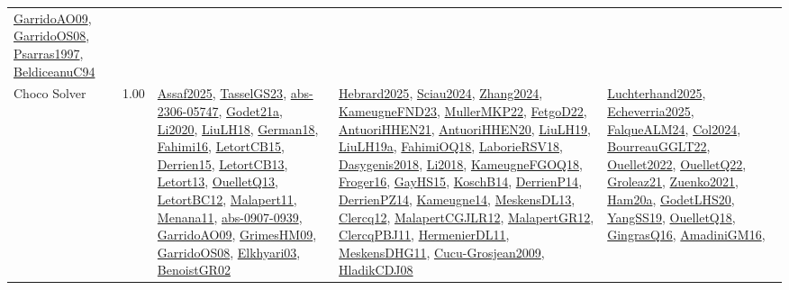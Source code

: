 {\begin{longtable}{p{3cm}r>{\raggedright\arraybackslash}p{6cm}>{\raggedright\arraybackslash}p{6cm}>{\raggedright\arraybackslash}p{8cm}}
\hyperref[detail:GarridoAO09]{GarridoAO09}, \hyperref[detail:GarridoOS08]{GarridoOS08}, \hyperref[detail:Psarras1997]{Psarras1997}, \hyperref[detail:BeldiceanuC94]{BeldiceanuC94}\\
\index{Choco Solver}\index{CPSystems!Choco Solver}Choco Solver &  1.00 & \hyperref[detail:Assaf2025]{Assaf2025}, \hyperref[detail:TasselGS23]{TasselGS23}, \hyperref[detail:abs-2306-05747]{abs-2306-05747}, \hyperref[detail:Godet21a]{Godet21a}, \hyperref[detail:Li2020]{Li2020}, \hyperref[detail:LiuLH18]{LiuLH18}, \hyperref[detail:German18]{German18}, \hyperref[detail:Fahimi16]{Fahimi16}, \hyperref[detail:LetortCB15]{LetortCB15}, \hyperref[detail:Derrien15]{Derrien15}, \hyperref[detail:LetortCB13]{LetortCB13}, \hyperref[detail:Letort13]{Letort13}, \hyperref[detail:OuelletQ13]{OuelletQ13}, \hyperref[detail:LetortBC12]{LetortBC12}, \hyperref[detail:Malapert11]{Malapert11}, \hyperref[detail:Menana11]{Menana11}, \hyperref[detail:abs-0907-0939]{abs-0907-0939}, \hyperref[detail:GarridoAO09]{GarridoAO09}, \hyperref[detail:GrimesHM09]{GrimesHM09}, \hyperref[detail:GarridoOS08]{GarridoOS08}, \hyperref[detail:Elkhyari03]{Elkhyari03}, \hyperref[detail:BenoistGR02]{BenoistGR02} & \hyperref[detail:Hebrard2025]{Hebrard2025}, \hyperref[detail:Sciau2024]{Sciau2024}, \hyperref[detail:Zhang2024]{Zhang2024}, \hyperref[detail:KameugneFND23]{KameugneFND23}, \hyperref[detail:MullerMKP22]{MullerMKP22}, \hyperref[detail:FetgoD22]{FetgoD22}, \hyperref[detail:AntuoriHHEN21]{AntuoriHHEN21}, \hyperref[detail:AntuoriHHEN20]{AntuoriHHEN20}, \hyperref[detail:LiuLH19]{LiuLH19}, \hyperref[detail:LiuLH19a]{LiuLH19a}, \hyperref[detail:FahimiOQ18]{FahimiOQ18}, \hyperref[detail:LaborieRSV18]{LaborieRSV18}, \hyperref[detail:Dasygenis2018]{Dasygenis2018}, \hyperref[detail:Li2018]{Li2018}, \hyperref[detail:KameugneFGOQ18]{KameugneFGOQ18}, \hyperref[detail:Froger16]{Froger16}, \hyperref[detail:GayHS15]{GayHS15}, \hyperref[detail:KoschB14]{KoschB14}, \hyperref[detail:DerrienP14]{DerrienP14}, \hyperref[detail:DerrienPZ14]{DerrienPZ14}, \hyperref[detail:Kameugne14]{Kameugne14}, \hyperref[detail:MeskensDL13]{MeskensDL13}, \hyperref[detail:Clercq12]{Clercq12}, \hyperref[detail:MalapertCGJLR12]{MalapertCGJLR12}, \hyperref[detail:MalapertGR12]{MalapertGR12}, \hyperref[detail:ClercqPBJ11]{ClercqPBJ11}, \hyperref[detail:HermenierDL11]{HermenierDL11}, \hyperref[detail:MeskensDHG11]{MeskensDHG11}, \hyperref[detail:Cucu-Grosjean2009]{Cucu-Grosjean2009}, \hyperref[detail:HladikCDJ08]{HladikCDJ08} & \hyperref[detail:Luchterhand2025]{Luchterhand2025}, \hyperref[detail:Echeverria2025]{Echeverria2025}, \hyperref[detail:FalqueALM24]{FalqueALM24}, \hyperref[detail:Col2024]{Col2024}, \hyperref[detail:BourreauGGLT22]{BourreauGGLT22}, \hyperref[detail:Ouellet2022]{Ouellet2022}, \hyperref[detail:OuelletQ22]{OuelletQ22}, \hyperref[detail:Groleaz21]{Groleaz21}, \hyperref[detail:Zuenko2021]{Zuenko2021}, \hyperref[detail:Ham20a]{Ham20a}, \hyperref[detail:GodetLHS20]{GodetLHS20}, \hyperref[detail:YangSS19]{YangSS19}, \hyperref[detail:OuelletQ18]{OuelletQ18}, \hyperref[detail:GingrasQ16]{GingrasQ16}, \hyperref[detail:AmadiniGM16]{AmadiniGM16}, 
\end{longtable}}

